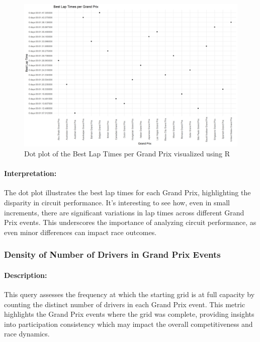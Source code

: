 \documentclass{article}
\begin{document}
\begin{figure}[H]
    \centering
    \includegraphics[width=\textwidth]{best_lap_times_per_gp_dotplot.png}
    \caption{Dot plot of the Best Lap Times per Grand Prix visualized using R}
\end{figure}

\paragraph{Interpretation:}
The dot plot illustrates the best lap times for each Grand Prix, highlighting the disparity in circuit performance. It's interesting to see how, even in small increments, there are significant variations in lap times across different Grand Prix events. This underscores the importance of analyzing circuit performance, as even minor differences can impact race outcomes.

\subsubsection{Density of Number of Drivers in Grand Prix Events}
\paragraph{Description:}
This query assesses the frequency at which the starting grid is at full capacity by counting the distinct number of drivers in each Grand Prix event. This metric highlights the Grand Prix events where the grid was complete, providing insights into participation consistency which may impact the overall competitiveness and race dynamics.
\end{document}
